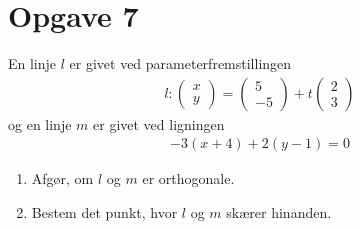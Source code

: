 \section*{Opgave 7}
En linje $l$ er givet ved parameterfremstillingen
\begin{align*}
	l: \begin{pmatrix}
		x \\ y
	\end{pmatrix}
	=
	\begin{pmatrix}
		5 \\ -5
	\end{pmatrix} +
	t
	\begin{pmatrix}
		2 \\ 3
	\end{pmatrix}
\end{align*}
og en linje $m$ er givet ved ligningen
\begin{align*}
	-3(x+4) + 2(y-1) = 0
\end{align*}
\begin{enumerate}[label=\roman*)]
	\item Afgør, om $l$ og $m$ er orthogonale. 
	\item Bestem det punkt, hvor $l$ og $m$ skærer hinanden. 
\end{enumerate}

